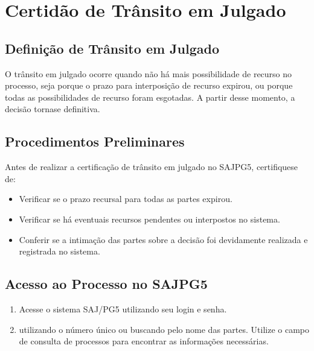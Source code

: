 \documentclass[letterpaper,10pt,brazil]{sphinxmanual}
\begin{document}
\sphinxstepscope


\section{Certidão de Trânsito em Julgado}
\label{\detokenize{09certificartransito:certidao-de-transito-em-julgado}}\label{\detokenize{09certificartransito::doc}}

\subsection{Definição de Trânsito em Julgado}
\label{\detokenize{09certificartransito:definicao-de-transito-em-julgado}}
\sphinxAtStartPar
O trânsito em julgado ocorre quando não há mais possibilidade de recurso no processo, seja porque o prazo para interposição de recurso expirou, ou porque todas as possibilidades de recurso foram esgotadas. A partir desse momento, a decisão torna\sphinxhyphen{}se definitiva.


\subsection{Procedimentos Preliminares}
\label{\detokenize{09certificartransito:procedimentos-preliminares}}
\sphinxAtStartPar
Antes de realizar a certificação de trânsito em julgado no SAJPG5, certifique\sphinxhyphen{}se de:
\begin{itemize}
\item {} 
\sphinxAtStartPar
Verificar se o prazo recursal para todas as partes expirou.

\item {} 
\sphinxAtStartPar
Verificar se há eventuais recursos pendentes ou interpostos no sistema.

\item {} 
\sphinxAtStartPar
Conferir se a intimação das partes sobre a decisão foi devidamente realizada e registrada no sistema.

\end{itemize}


\subsection{Acesso ao Processo no SAJPG5}
\label{\detokenize{09certificartransito:acesso-ao-processo-no-sajpg5}}\begin{enumerate}
%
\item {} 
\sphinxAtStartPar
Acesse o sistema SAJ/PG5 utilizando seu login e senha.

\item {} 
\sphinxAtStartPar
{} utilizando o número único ou buscando pelo nome das partes. Utilize o campo de consulta de processos para encontrar as informações necessárias.

\end{enumerate}
\end{document}
